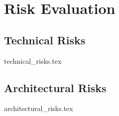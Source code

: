 \section{Risk Evaluation}
\label{sec:risk_evaluation}

\subsection{Technical Risks}
\label{sec:risk_evaluation:technical}
{technical_risks.tex}

\subsection{Architectural Risks}
\label{sec:risk_evaluation:architectural}
{architectural_risks.tex}
